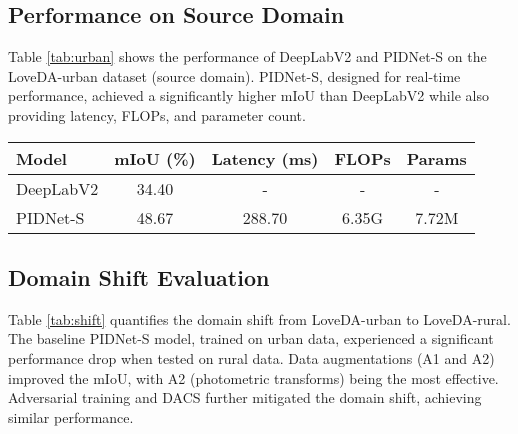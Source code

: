 \documentclass{article}
\begin{document}
\begin{multicols}{2}
		\subsection{Performance on Source Domain}
		Table \ref{tab:urban} shows the performance of DeepLabV2 and PIDNet-S on the LoveDA-urban dataset (source domain). PIDNet-S, designed for real-time performance, achieved a significantly higher mIoU than DeepLabV2 while also providing latency, FLOPs, and parameter count.
		
			\vspace{2cm}
			\centering
			\label{tab:urban}
			\tiny
			\begin{tabular}{|l|c|c|c|c|}
				\hline
				Model & mIoU (\%) & Latency (ms) & FLOPs & Params \\ \hline
				DeepLabV2 & 34.40 & - & - & - \\ \hline
				PIDNet-S & 48.67 & 288.70 & 6.35G & 7.72M \\ \hline
			\end{tabular}
				\vspace{0.2cm}
		
		
		
		

		
		\subsection{Domain Shift Evaluation}
		\small
		Table \ref{tab:shift} quantifies the domain shift from LoveDA-urban to LoveDA-rural. The baseline PIDNet-S model, trained on urban data, experienced a significant performance drop when tested on rural data. Data augmentations (A1 and A2) improved the mIoU, with A2 (photometric transforms) being the most effective. Adversarial training and DACS further mitigated the domain shift, achieving similar performance.
		

			\centering
			\label{tab:shift}


\end{multicols}
\end{document}
